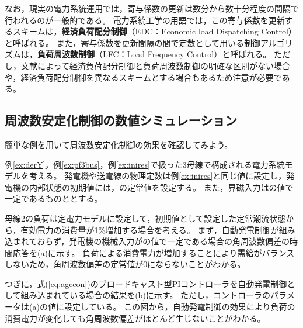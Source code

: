 \documentclass[tombow,dvipdfmx]{corona-a5-1.1}
\begin{document}
なお，現実の電力系統運用では，寄与係数の更新は数分から数十分程度の間隔で行われるのが一般的である\cite[第11.1節]{kundur1994power}。
電力系統工学の用語では，この寄与係数を更新するスキームは，\textbf{経済負荷配分制御}（EDC：Economic load Dispatching Control）と呼ばれる。
また，寄与係数を更新間隔の間で定数として用いる制御アルゴリズムは，\textbf{負荷周波数制御}（LFC：Load Frequency Control）と呼ばれる。
ただし，文献によって経済負荷配分制御と負荷周波数制御の明確な区別がない場合や，経済負荷配分制御を異なるスキームとする場合もあるため注意が必要である。


\subsection{周波数安定化制御の数値シミュレーション}

簡単な例を用いて周波数安定化制御の効果を確認してみよう。

\begin{例}[自動発電制御による周波数の安定化]\label{ex:agcdemo}
例\ref{ex:derY}，例\ref{ex:pf3bus}，例\ref{ex:inires}で扱った3母線で構成される電力系統モデルを考える。
発電機や送電線の物理定数は例\ref{ex:inires}と同じ値に設定し，発電機の内部状態の初期値には，の定常値を設定する。
また，界磁入力はの値で一定であるものととする。

母線2の負荷は定電力モデルに設定して，初期値として設定した定常潮流状態から，有効電力の消費量が1\%増加する場合を考える。
まず，自動発電制御が組み込まれておらず，発電機の機械入力がの値で一定である場合の角周波数偏差の時間応答を(a)に示す。
負荷による消費電力が増加することにより需給がバランスしないため，角周波数偏差の定常値が0にならないことがわかる。

つぎに，式(\ref{eq:agccon})のブロードキャスト型PIコントローラを自動発電制御として組み込まれている場合の結果を(b)に示す。
ただし，コントローラのパラメータは(a)の値に設定している。
この図から，自動発電制御の効果により負荷の消費電力が変化しても角周波数偏差がほとんど生じないことがわかる。
\end{例}
\end{document}
